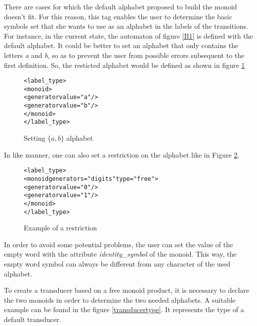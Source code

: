 \documentclass[a4paper]{article}
\begin{document}
There are cases for which the default alphabet proposed to build the
monoid doesn't fit. For this reason, this tag enables the user to
determine the basic symbols set that she wants to use as an alphabet in the
labels of the transitions.\\

For instance, in the current state, the automaton of figure \ref{B1} is
defined with the default alphabet. It could be better to set an alphabet that
only contains the letters \textit{a} and \textit{b}, so as to prevent the user
from possible errors subsequent to the first definition. So, the resticted
alphabet would be defined as shown in figure \ref{alpha1}

{\small

\begin{figure}[h]
  \begin{center}
\begin{alltt}
<label_type>
  <monoid>
     <generator value="a"/>
     <generator value="b"/>
  </monoid>
</label_type>
\end{alltt}

\caption{Setting $\{a, b\}$ alphabet}
\label{alpha1}
  \end{center}
\end{figure}
}

In like manner, one can also set a restriction on the alphabet like in Figure \ref{restriction1}.

{\small

\begin{figure}[h]
  \begin{center}
\begin{alltt}
<label_type>
  <monoid generators="digits" type="free">
    <generator value="0"/>
    <generator value="1"/>
  </monoid>
</label_type>
\end{alltt}

\caption{Example of a restriction}
\label{restriction1}
  \end{center}
\end{figure}
}

In order to avoid some potential problems, the user can set the value of the
empty word with the attribute \textit{identity\_symbol} of the monoid. This way,
the empty word symbol can always be different from any character of the used
alphabet.

To create a transducer based on a free monoid product, it is necessary to
declare the two monoids in order to determine the two needed alphabets. A
suitable example can be found in the figure \ref{transducertype}. It represents
the type of a default transducer.\\
\end{document}
